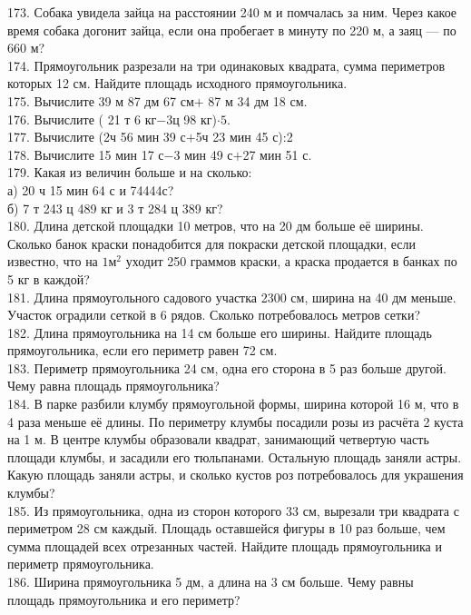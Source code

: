 173. Собака увидела зайца на расстоянии 240 м и помчалась за ним. Через какое время собака догонит зайца, если она пробегает в минуту по 220 м, а заяц --- по 660 м?\\
174. Прямоугольник разрезали на три одинаковых квадрата, сумма периметров которых 12 см. Найдите площадь исходного прямоугольника.\\
175. Вычислите 39 м 87 дм 67 см$+$ 87 м 34 дм 18 см.\\
176. Вычислите ( 21 т 6 кг$-$3ц 98 кг)$\cdot5.$\\
177. Вычислите (2ч 56 мин 39 с$+$5ч 23 мин 45 с):2\\
178. Вычислите 15 мин 17 с$-$3 мин 49 с$+$27 мин 51 с.\\
179. Какая из величин больше и на сколько:\\
а) 20 ч 15 мин 64 с и 74444с?\\
б) 7 т 243 ц 489 кг и 3 т 284 ц 389 кг?\\
180. Длина детской площадки 10 метров, что на 20 дм больше её ширины. Сколько банок краски понадобится для покраски детской площадки, если известно, что на $1\text{м}^2$ уходит 250 граммов краски, а краска продается в банках по 5 кг в каждой?\\
181. Длина прямоугольного садового участка 2300 см, ширина на 40 дм меньше. Участок оградили сеткой в 6 рядов. Сколько потребовалось метров сетки?\\
182. Длина прямоугольника на 14 см больше его ширины. Найдите площадь прямоугольника, если его периметр равен 72 см.\\
183. Периметр прямоугольника 24 см, одна его сторона в 5 раз больше другой. Чему равна площадь прямоугольника?\\
184. В парке разбили клумбу прямоугольной формы, ширина которой 16 м, что в 4 раза меньше её длины. По периметру клумбы посадили розы из  расчёта 2 куста на 1 м. В центре клумбы образовали квадрат, занимающий четвертую часть площади клумбы, и засадили его тюльпанами. Остальную площадь заняли астры. Какую площадь заняли астры, и сколько кустов роз потребовалось для украшения клумбы?\\
185. Из прямоугольника, одна из сторон которого 33 см, вырезали три квадрата с периметром 28 см каждый. Площадь оставшейся фигуры в 10 раз больше, чем сумма площадей всех отрезанных частей. Найдите площадь прямоугольника и периметр прямоугольника.\\
186. Ширина прямоугольника 5 дм, а длина на 3 см больше. Чему равны площадь прямоугольника и его периметр?\\

